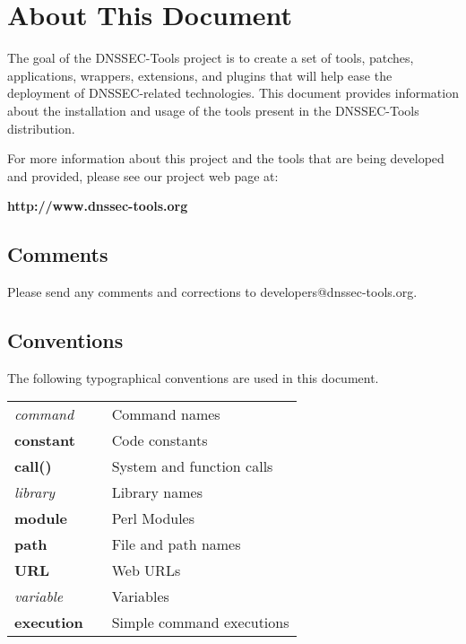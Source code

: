 \documentclass[12pt]{article}
\newcommand{\cmd}[1]{{\em #1}}
\newcommand{\const}[1]{{\bf #1}}
\newcommand{\func}[1]{{\bf #1}}
\newcommand{\lib}[1]{{\em #1}}
\newcommand{\perlmod}[1]{{\bf #1}}
\newcommand{\path}[1]{{\bf #1}}
\newcommand{\url}[1]{{\bf #1}}
\newcommand{\var}[1]{{\em #1}}
\newcommand{\xqt}[1]{{\bf #1}}
\begin{document}

\clearpage

\section{About This Document}
\label{about}

The goal of the DNSSEC-Tools project is to create a set of tools, patches,
applications, wrappers, extensions, and plugins that will help ease the
deployment of DNSSEC-related technologies. This document provides information
about the installation and usage of the tools present in the DNSSEC-Tools
distribution.

For more information about this project and the tools that are being developed
and provided, please see our project web page at:

\url{http://www.dnssec-tools.org}

\subsection{Comments}

Please send any comments and corrections to developers@dnssec-tools.org.

\vspace{1in}

\subsection{Conventions}

The following typographical conventions are used in this document.

\begin{table}[hb]
\begin{tabular}{lll}
\cmd{command}		& & Command names\\
\const{constant}	& & Code constants\\
\func{call()}		& & System and function calls\\
\lib{library}		& & Library names\\
\perlmod{module}	& & Perl Modules\\
\path{path}		& & File and path names\\
\url{URL}		& & Web URLs\\
\var{variable}		& & Variables\\
\xqt{execution}		& & Simple command executions\\
\end{tabular}
\end{table}
\end{document}
